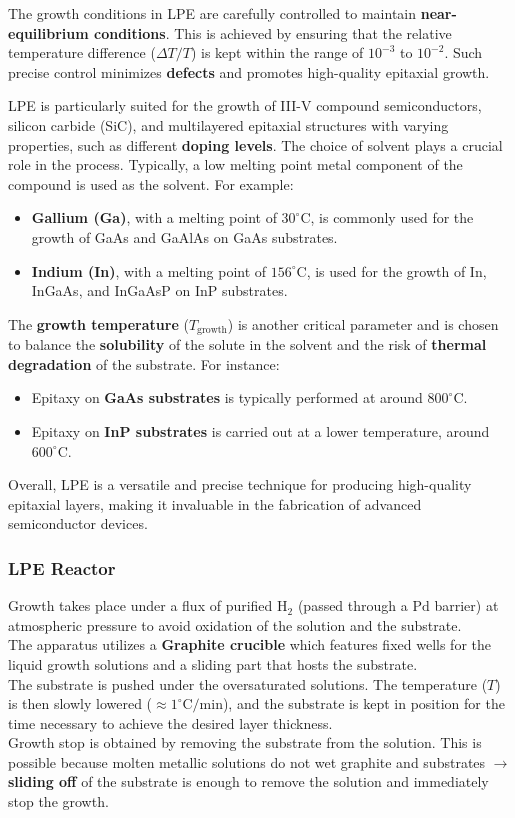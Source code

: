 \documentclass{report}
\begin{document}
The growth conditions in LPE are carefully controlled to maintain \textbf{near-equilibrium conditions}. This is achieved by ensuring that the relative temperature difference ($\Delta T/T$) is kept within the range of $10^{-3}$ to $10^{-2}$. Such precise control minimizes \textbf{defects} and promotes high-quality epitaxial growth.

LPE is particularly suited for the growth of III-V compound semiconductors, silicon carbide (SiC), and multilayered epitaxial structures with varying properties, such as different \textbf{doping levels}. The choice of solvent plays a crucial role in the process. Typically, a low melting point metal component of the compound is used as the solvent. For example:
\begin{itemize}
    \item \textbf{Gallium (Ga)}, with a melting point of $30^\circ\text{C}$, is commonly used for the growth of GaAs and GaAlAs on GaAs substrates.
    \item \textbf{Indium (In)}, with a melting point of $156^\circ\text{C}$, is used for the growth of In, InGaAs, and InGaAsP on InP substrates.
\end{itemize}

The \textbf{growth temperature} ($T_\text{growth}$) is another critical parameter and is chosen to balance the \textbf{solubility} of the solute in the solvent and the risk of \textbf{thermal degradation} of the substrate. For instance:
\begin{itemize}
    \item Epitaxy on \textbf{GaAs substrates} is typically performed at around $800^\circ\text{C}$.
    \item Epitaxy on \textbf{InP substrates} is carried out at a lower temperature, around $600^\circ\text{C}$.
\end{itemize}

Overall, LPE is a versatile and precise technique for producing high-quality epitaxial layers, making it invaluable in the fabrication of advanced semiconductor devices.

\subsubsection{LPE Reactor}
Growth takes place under a flux of purified $\text{H}_2$ (passed through a $\text{Pd}$ barrier) at atmospheric pressure to avoid oxidation of the solution and the substrate.\\ The apparatus utilizes a \textbf{Graphite crucible} which features fixed wells for the liquid growth solutions and a sliding part that hosts the substrate.\\ The substrate is pushed under the oversaturated solutions. The temperature ($T$) is then slowly lowered ($\approx 1^\circ\text{C}/\text{min}$), and the substrate is kept in position for the time necessary to achieve the desired layer thickness.\\ Growth stop is obtained by removing the substrate from the solution. This is possible because molten metallic solutions do not wet graphite and substrates $\rightarrow$ \textbf{sliding off} of the substrate is enough to remove the solution and immediately stop the growth.
\end{document}
